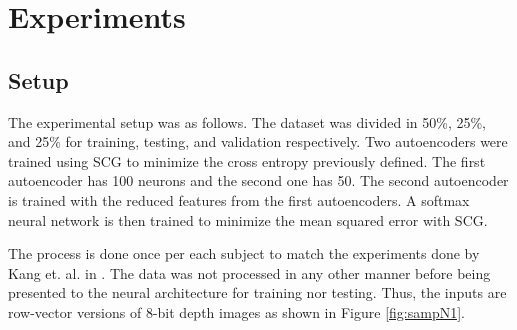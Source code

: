 \documentclass[a4paper]{article}
\begin{document}
\section{Experiments}
\subsection{Setup}
The experimental setup was as follows. The dataset was divided in 50\%, 25\%,
and 25\% for training, testing, and validation respectively. Two autoencoders
were trained using SCG to minimize the cross entropy previously defined. The
first autoencoder has 100 neurons and the second one has 50. The second
autoencoder is trained with the reduced features from the first autoencoders. 
A softmax neural network is then trained to minimize the mean squared error
with SCG. 

The process is done once per each subject to match the experiments done by Kang
et. al. in \cite{kang2015real}. The data was not processed in any other manner
before being presented to the neural architecture for training nor testing.
Thus, the inputs are row-vector versions of 8-bit depth images as shown in
Figure \ref{fig:sampN1}.
\end{document}
